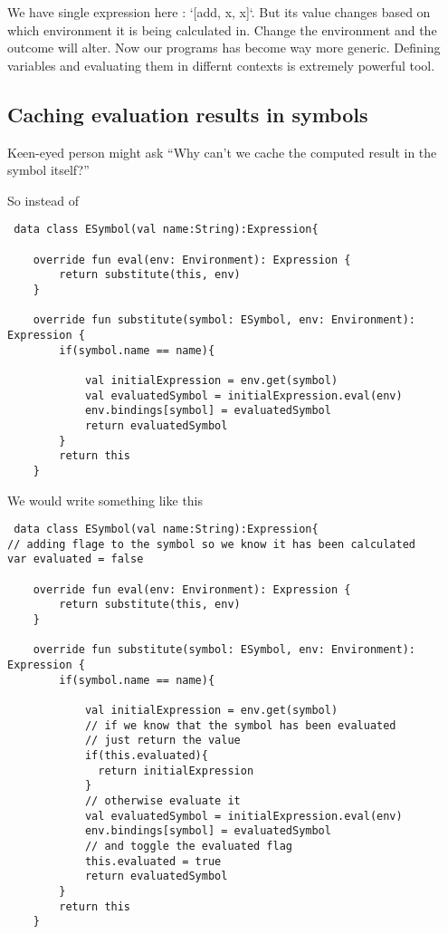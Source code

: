 \documentclass[11pt]{article}
\begin{document}
We have single expression here :  `[add, x, x]`.
But its value changes based on which environment it is being calculated in.
Change the environment and the outcome will alter.
Now our programs has become way more generic. Defining variables and evaluating them in differnt contexts is extremely powerful tool.

\subsection{Caching evaluation results in symbols}
\label{sec:org6cc3fe8}
Keen-eyed person might ask ``Why can't we cache the computed result in the symbol itself?''

So instead of
\begin{verbatim}
 data class ESymbol(val name:String):Expression{

    override fun eval(env: Environment): Expression {
        return substitute(this, env)
    }

    override fun substitute(symbol: ESymbol, env: Environment): Expression {
        if(symbol.name == name){

            val initialExpression = env.get(symbol)
            val evaluatedSymbol = initialExpression.eval(env)
            env.bindings[symbol] = evaluatedSymbol
            return evaluatedSymbol
        }
        return this
    }

\end{verbatim}

We would write something like this

\begin{verbatim}
 data class ESymbol(val name:String):Expression{
// adding flage to the symbol so we know it has been calculated
var evaluated = false

    override fun eval(env: Environment): Expression {
        return substitute(this, env)
    }

    override fun substitute(symbol: ESymbol, env: Environment): Expression {
        if(symbol.name == name){

            val initialExpression = env.get(symbol)
            // if we know that the symbol has been evaluated
            // just return the value
            if(this.evaluated){
              return initialExpression
            }
            // otherwise evaluate it
            val evaluatedSymbol = initialExpression.eval(env)
            env.bindings[symbol] = evaluatedSymbol
            // and toggle the evaluated flag
            this.evaluated = true
            return evaluatedSymbol
        }
        return this
    }

\end{verbatim}
\end{document}
